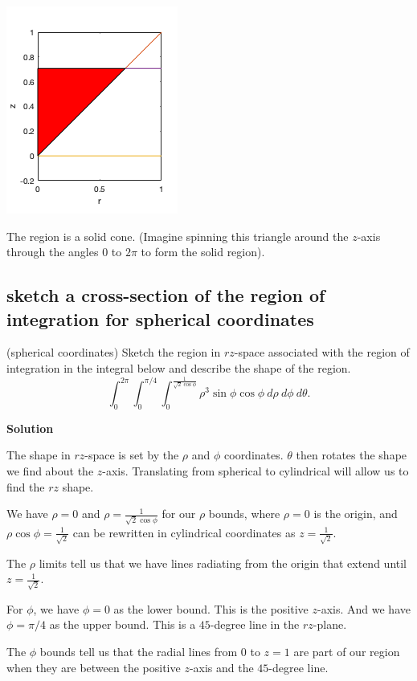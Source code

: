 \documentclass[12pt,letterpaper,noanswers]{exam}
\begin{document}
\includegraphics[scale=0.8]{img/C13skill.png}

The region is a solid cone.  (Imagine spinning this triangle around the $z$-axis through the angles $0$ to $2\pi$ to form the solid region).

\subsection{sketch a cross-section of the region of integration for spherical coordinates}
(spherical coordinates) Sketch the region in $rz$-space associated with the region of integration in the integral below and describe the shape of the region.
\[\int_0^{2\pi}\int_0^{\pi/4}\int_0^{\frac{1}{\sqrt{2}\cos\phi}} \rho^3\sin\phi\cos\phi\ d\rho\ d\phi\ d\theta.\]

\noindent\textbf{Solution}

The shape in $rz$-space is set by the $\rho$ and $\phi$ coordinates.  $\theta$ then rotates the shape we find about the $z$-axis.  Translating from spherical to cylindrical will allow us to find the $rz$ shape.

We have $\rho = 0$ and $\rho = \frac{1}{\sqrt{2}\cos\phi}$ for our $\rho$ bounds, where $\rho = 0$ is the origin, and $\rho\cos\phi = \frac{1}{\sqrt{2}}$ can be rewritten in cylindrical coordinates as $z = \frac{1}{\sqrt{2}}$.

The $\rho$ limits tell us that we have lines radiating from the origin that extend until $z = \frac{1}{\sqrt{2}}$.

For $\phi$, we have $\phi = 0$ as the lower bound.  This is the positive $z$-axis.  And we have $\phi = \pi/4$ as the upper bound.  This is a $45$-degree line in the $rz$-plane.

The $\phi$ bounds tell us that the radial lines from $0$ to $z=1$ are part of our region when they are between the positive $z$-axis and the $45$-degree line.
\end{document}
